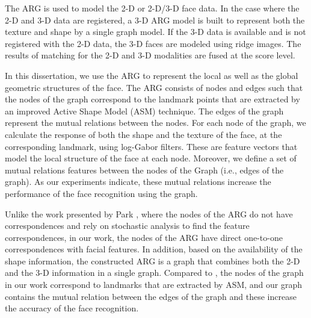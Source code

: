 The ARG is used to model the 2-D or 2-D/3-D face data. In the case
where the 2-D and 3-D data are registered, a 3-D ARG model is built
to represent both the texture and shape by a single graph model. If
the 3-D data is available and is not registered with the 2-D data,
the 3-D faces are modeled using ridge images. The results of
matching for the 2-D and 3-D modalities are fused at the score
level.

In this dissertation, we use the ARG to represent the local as well
as the global geometric structures of the face. The ARG consists of
nodes and edges such that the nodes of the graph correspond to the
landmark points that are extracted by an improved Active Shape Model
(ASM) technique. The edges of the graph represent the mutual
relations between the nodes. For each node of the graph, we
calculate the response of both the shape and the texture of the
face, at the corresponding landmark, using log-Gabor filters. These
are feature vectors that model the local structure of the face at
each node. Moreover, we define a set of mutual relations features
between the nodes of the Graph (i.e., edges of the graph). As our
experiments indicate, these mutual relations increase the
performance of the face recognition using the graph.

Unlike the work presented by Park \etal \cite{park_05}, where the
nodes of the ARG do not have correspondences and rely on stochastic
analysis to find the feature correspondences, in our work, the nodes
of the ARG have direct one-to-one correspondences with facial
features. In addition, based on the availability of the shape
information, the constructed ARG is a graph that combines both the
2-D and the 3-D information in a single graph. Compared to
\cite{Wiskott97}, the nodes of the graph in our work correspond to
landmarks that are extracted by ASM, and our graph contains the
mutual relation between the edges of the graph and these increase
the accuracy of the face recognition.

